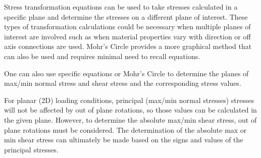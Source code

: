 \documentclass[
  letterpaper,
  DIV=11,
  numbers=noendperiod]{scrreprt}
\theoremstyle{definition}
\theoremstyle{remark}
\begin{document}
\begin{tcolorbox}[enhanced jigsaw, leftrule=.75mm, colbacktitle=quarto-callout-note-color!10!white, breakable, opacityback=0, colback=white, titlerule=0mm, toprule=.15mm, colframe=quarto-callout-note-color-frame, coltitle=black, title={Key takeaways}, toptitle=1mm, bottomrule=.15mm, rightrule=.15mm, left=2mm, arc=.35mm, opacitybacktitle=0.6, bottomtitle=1mm]

Stress transformation equations can be used to take stresses calculated
in a specific plane and determine the stresses on a different plane of
interest. These types of transformation calculations could be necessary
when multiple planes of interest are involved such as when material
properties vary with direction or off axis connections are used. Mohr's
Circle provides a more graphical method that can also be used and
requires minimal need to recall equations.

One can also use specific equations or Mohr's Circle to determine the
planes of max/min normal stress and shear stress and the corresponding
stress values.

For planar (2D) loading conditions, principal (max/min normal stresses)
stresses will not be affected by out of plane rotations, so those values
can be calculated in the given plane. However, to determine the absolute
max/min shear stress, out of plane rotations must be considered. The
determination of the absolute max or min shear stress can ultimately be
made based on the signs and values of the principal stresses.

\end{tcolorbox}
\end{document}
